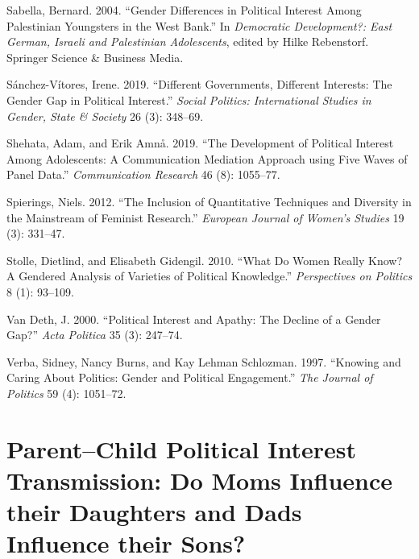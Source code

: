 \documentclass[
  letterpaper,
  DIV=11,
  numbers=noendperiod]{scrreprt}
\newlength{\cslhangindent}
\newlength{\cslentryspacingunit} %
\newenvironment{CSLReferences}[2] %
 {%
  \setlength{\parindent}{0pt}
  \ifodd #1
  \let\oldpar\par
  \def\par{\hangindent=\cslhangindent\oldpar}
  \fi
  \setlength{\parskip}{#2\cslentryspacingunit}
 }%
 {}
\begin{document}
\begin{CSLReferences}{1}{0}
\leavevmode{}%
Sabella, Bernard. 2004. {``{Gender Differences in Political Interest
Among Palestinian Youngsters in the West Bank}.''} In \emph{{Democratic
Development?: East German, Israeli and Palestinian Adolescents}}, edited
by Hilke Rebenstorf. Springer Science \& Business Media.

\leavevmode{}%
Sánchez-Vítores, Irene. 2019. {``{Different Governments, Different
Interests: The Gender Gap in Political Interest}.''} \emph{{Social
Politics: International Studies in Gender, State \& Society}} 26 (3):
348--69.

\leavevmode{}%
Shehata, Adam, and Erik Amnå. 2019. {``{The Development of Political
Interest Among Adolescents: A Communication Mediation Approach using
Five Waves of Panel Data}.''} \emph{Communication Research} 46 (8):
1055--77.

\leavevmode{}%
Spierings, Niels. 2012. {``{The Inclusion of Quantitative Techniques and
Diversity in the Mainstream of Feminist Research}.''} \emph{European
Journal of Women's Studies} 19 (3): 331--47.

\leavevmode{}%
Stolle, Dietlind, and Elisabeth Gidengil. 2010. {``{What Do Women Really
Know? A Gendered Analysis of Varieties of Political Knowledge}.''}
\emph{Perspectives on Politics} 8 (1): 93--109.

\leavevmode{}%
Van Deth, J. 2000. {``{Political Interest and Apathy: The Decline of a
Gender Gap?}''} \emph{Acta Politica} 35 (3): 247--74.

\leavevmode{}%
Verba, Sidney, Nancy Burns, and Kay Lehman Schlozman. 1997. {``{Knowing
and Caring About Politics: Gender and Political Engagement}.''}
\emph{The Journal of Politics} 59 (4): 1051--72.

\end{CSLReferences}


\hypertarget{sec-chap4}{%
\chapter{Parent--Child Political Interest Transmission: Do Moms
Influence their Daughters and Dads Influence their
Sons?}\label{sec-chap4}}
\end{document}

